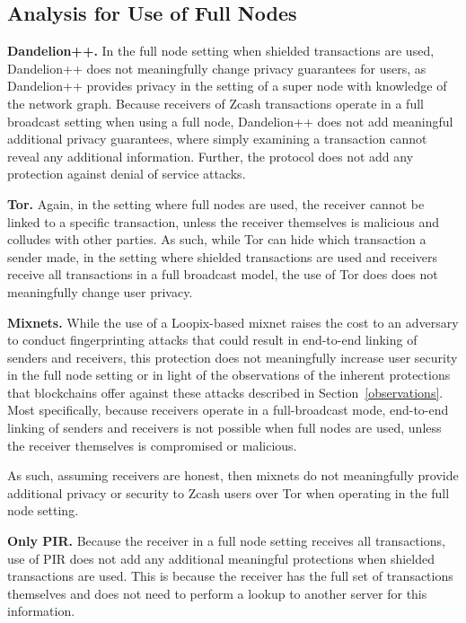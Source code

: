 \documentclass{article}
\begin{document}
\subsection{Analysis for Use of Full Nodes}

\textbf{Dandelion++.}
In the full node setting when shielded transactions are used, Dandelion++ does
not meaningfully change privacy
guarantees for users, as Dandelion++ provides privacy in the setting of a
super node with knowledge of the network graph. Because receivers of
Zcash transactions operate in a full broadcast setting when using a full node,
Dandelion++ does not add meaningful additional privacy guarantees, where simply
examining a transaction cannot reveal any additional information.
Further, the protocol does not add any protection against denial of service
attacks.

\textbf{Tor.}
Again, in the setting where full nodes are used, the receiver cannot be linked
to a specific transaction, unless the receiver themselves is malicious and
colludes with other parties. As
such, while Tor can hide which transaction a sender made, in the setting where
shielded transactions are used and receivers receive all transactions in a full
broadcast model, the use of Tor does does not meaningfully change user privacy.

\textbf{Mixnets.}
While the use of a Loopix-based mixnet raises the cost to an adversary to
conduct fingerprinting attacks that could result in end-to-end linking of
senders and receivers, this protection does not meaningfully increase user
security in the full node setting or in light of the observations of the
inherent protections that blockchains offer against these attacks described in
Section~\ref{observations}. Most specifically, because receivers operate in a
full-broadcast mode, end-to-end linking of senders and receivers is not
possible when full nodes are used, unless the receiver themselves is
compromised or malicious.

As such, assuming receivers are honest, then mixnets do not meaningfully provide
additional privacy or security to Zcash users over Tor when operating in the
full node setting.

\textbf{Only PIR.}
Because the receiver in a full node setting receives all transactions, use of
PIR does not add any additional meaningful protections when shielded
transactions are used. This is because the receiver has the full set of
transactions themselves and does not need to perform a lookup to another server
for this information.
\end{document}
